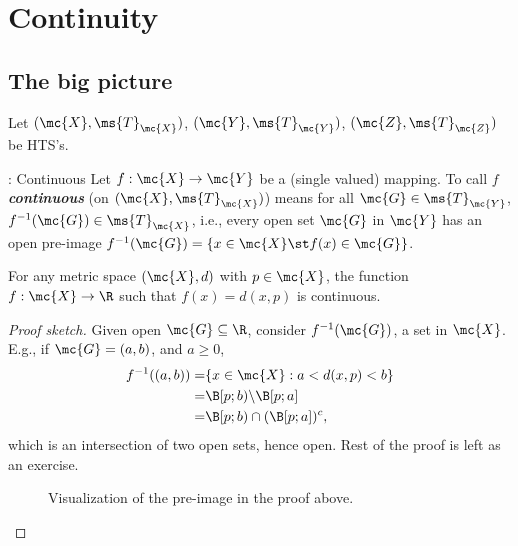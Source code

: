 \clearpage

\section{Continuity}

\subsection{The big picture}

Let \((\mc{X},\ms{T}_{\mc{X}})\), \((\mc{Y},\ms{T}_{\mc{Y}})\), \((\mc{Z},\ms{T}_{\mc{Z}})\) be HTS's.
\begin{ndef}{: Continuous}
	Let \(f:\mc{X}\to\mc{Y}\) be a (single valued) mapping. To call \(f\) \emph{\textbf{continuous}} (on \((\mc{X},\ms{T}_{\mc{X}})\)) means for all \(\mc{G}\in\ms{T}_{\mc{Y}}\), \(f^{-1}(\mc{G})\in\ms{T}_{\mc{X}}\), i.e., every open set \(\mc{G}\) in \(\mc{Y}\) has an open pre-image \(f^{-1}(\mc{G})=\{x\in\mc{X}\st f(x)\in\mc{G}\}\).
\end{ndef}
\begin{example}
	For any metric space \((\mc{X},d)\) with \(p\in\mc{X}\), the function \(f:\mc{X}\to\R\) such that \(f(x)=d(x,p)\) is continuous.
\end{example}
\begin{proof}[Proof sketch]
	Given open \(\mc{G}\subseteq\R\), consider \(f^{-1}(\mc{G})\), a set in \(\mc{X}\). E.g., if \(\mc{G}=(a,b)\), and \(a\geq 0\), 
	\begin{align*}
		f^{-1}((a,b))=&\{x\in\mc{X}:a<d(x,p)<b\}\\
		=&\B[p;b)\backslash\B[p;a]\\
		=&\B[p;b)\cap(\B[p;a])^c,
	\end{align*}
	which is an intersection of two open sets, hence open. Rest of the proof is left as an exercise.
	\begin{figure}[htb]
		\centering
		\caption{Visualization of the pre-image in the proof above.}
	\end{figure}
\end{proof}
